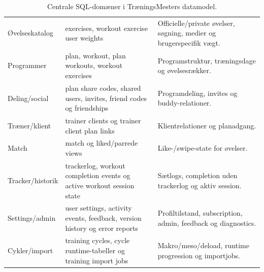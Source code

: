 \begin{table}[htbp]
\small
\renewcommand{\arraystretch}{1.15}
\begin{tabularx}{\textwidth}{>{\RaggedRight\arraybackslash}p{} >{\RaggedRight\arraybackslash}p{} Y}
\toprule
{} &  &  \\
\midrule
Øvelseskatalog & exercises, workout exercise user weights & Officielle/private øvelser, søgning, medier og brugerspecifik vægt. \\
Programmer & plan, workout, plan workouts, workout exercises & Programstruktur, træningsdage og øvelsesrækker. \\
Deling/social & plan share codes, shared users, invites, friend codes og friendships & Programdeling, invites og buddy-relationer. \\
Træner/klient & trainer clients og trainer client plan links & Klientrelationer og planadgang. \\
Match & match og liked/parrede views & Like-/swipe-state for øvelser. \\
Tracker/historik & trackerlog, workout completion events og active workout session state & Sætlogs, completion uden trackerlog og aktiv session. \\
Settings/admin & user settings, activity events, feedback, version history og error reports & Profiltilstand, subscription, admin, feedback og diagnostics. \\
Cykler/import & training cycles, cycle runtime-tabeller og training import jobs & Makro/meso/deload, runtime progression og importjobs. \\
\bottomrule
\end{tabularx}
\caption{Centrale SQL-domæner i TræningsMesters datamodel.}
\label{tab:tm-sql-domain-overblik}
\end{table}

